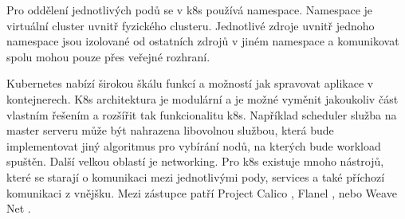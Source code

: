 Pro oddělení jednotlivých podů se v k8s používá namespace. Namespace je virtuální cluster uvnitř fyzického clusteru. Jednotlivé zdroje uvnitř jednoho namespace jsou izolované od ostatních zdrojů v jiném namespace a komunikovat spolu mohou pouze přes veřejné rozhraní. \par
Kubernetes nabízí širokou škálu funkcí a možností jak spravovat aplikace v kontejnerech. K8s architektura je modulární a je možné vyměnit jakoukoliv část vlastním řešením a rozšířit tak funkcionalitu k8s. Například scheduler služba na master serveru může být nahrazena libovolnou službou, která bude implementovat jiný algoritmus pro vybírání nodů, na kterých bude workload spuštěn. Další velkou oblastí je networking. Pro k8s existuje mnoho nástrojů, které se starají o komunikaci mezi jednotlivými pody, services a také příchozí komunikaci z vnějšku. Mezi zástupce patří Project Calico \cite{calico}, Flanel \cite{flanel}, nebo Weave Net \cite{weave}. 

